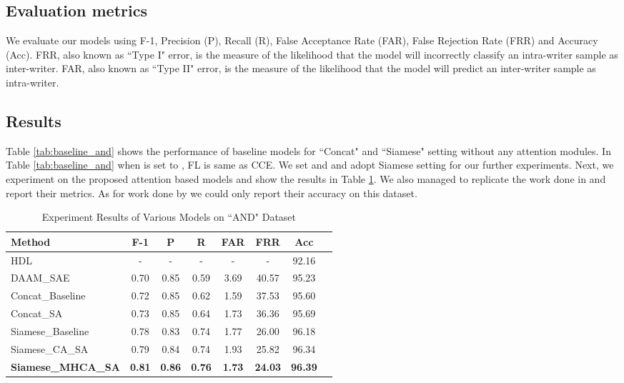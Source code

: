 \documentclass[a4paper,conference]{IEEEtran}
\begin{document}
\subsection{Evaluation metrics}
We evaluate our models using F-1, Precision (P), Recall (R), False Acceptance Rate (FAR), False Rejection Rate (FRR) and Accuracy (Acc). FRR, also known as ``Type I" error, is the measure of the likelihood that the model will incorrectly classify an intra-writer sample as inter-writer. FAR, also known as ``Type II" error, is the measure of the likelihood that the model will predict an inter-writer sample as intra-writer. 
\subsection{Results}
Table \ref{tab:baseline_and} shows the performance of baseline models for ``Concat" and ``Siamese" setting without any attention modules. In Table \ref{tab:baseline_and} when  is set to , FL is same as CCE.
We set  and  and adopt Siamese setting for our further experiments.
\newline \indent Next, we experiment on the proposed attention based models and show the results in Table \ref{tab:results}. We also managed to replicate the work done in \cite{chauhan_explanation_2019} and report their metrics. As for work done by \cite{shaikh_hybrid_2018} we could only report their accuracy on this dataset. 
\begin{table}[!htp]\centering
\caption{Experiment Results of Various Models on ``AND" Dataset}\label{tab:results}
\scriptsize
\begin{tabular}{lccccccc}\toprule
\textbf{Method} &\textbf{F-1} &\textbf{P} &\textbf{R} &\textbf{FAR} &\textbf{FRR} &\textbf{Acc} \\\midrule
HDL \cite{shaikh_hybrid_2018} &- &- &- &- &- &92.16 \\
DAAM\_SAE \cite{chauhan_explanation_2019} &0.70 &0.85 &0.59 &3.69 &40.57 &95.23 \\
Concat\_Baseline &0.72 &0.85 &0.62 &1.59 &37.53 &95.60 \\
Concat\_SA &0.73 &0.85 &0.64 &1.73 &36.36 &95.69 \\
Siamese\_Baseline &0.78 &0.83 &0.74 &1.77 &26.00 &96.18 \\
Siamese\_CA\_SA &0.79 &0.84 &0.74 &1.93 &25.82 &96.34 \\
\textbf{Siamese\_MHCA\_SA} &\textbf{0.81} &\textbf{0.86} &\textbf{0.76} &\textbf{1.73} &\textbf{24.03} &\textbf{96.39} \\
\bottomrule
\end{tabular}
\end{table}
\end{document}
